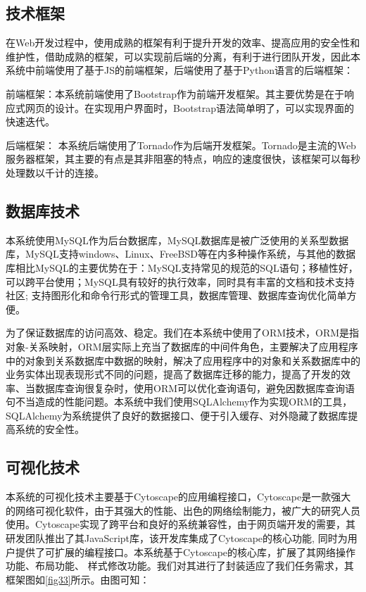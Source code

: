 \subsection{技术框架}
在Web开发过程中，使用成熟的框架有利于提升开发的效率、提高应用的安全性和维护性，借助成熟的框架，可以实现前后端的分离，有利于进行团队开发，因此本系统中前端使用了基于JS的前端框架，后端使用了基于Python语言的后端框架：

前端框架：本系统前端使用了Bootstrap作为前端开发框架。其主要优势是在于响应式网页的设计。在实现用户界面时，Bootstrap语法简单明了，可以实现界面的快速迭代。

后端框架： 本系统后端使用了Tornado作为后端开发框架。Tornado是主流的Web服务器框架，其主要的有点是其非阻塞的特点，响应的速度很快，该框架可以每秒处理数以千计的连接。


\subsection{数据库技术}
本系统使用MySQL作为后台数据库，MySQL数据库是被广泛使用的关系型数据库，MySQL支持windows、Linux、FreeBSD等在内多种操作系统，与其他的数据库相比MySQL的主要优势在于：MySQL支持常见的规范的SQL语句；移植性好，可以跨平台使用；MySQL具有较好的执行效率，同时具有丰富的文档和技术支持社区; 支持图形化和命令行形式的管理工具，数据库管理、数据库查询优化简单方便。

为了保证数据库的访问高效、稳定。我们在本系统中使用了ORM技术，ORM是指对象-关系映射，ORM层实际上充当了数据库的中间件角色，主要解决了应用程序中的对象到关系数据库中数据的映射，解决了应用程序中的对象和关系数据库中的业务实体出现表现形式不同的问题，提高了数据库迁移的能力，提高了开发的效率、当数据库查询很复杂时，使用ORM可以优化查询语句，避免因数据库查询语句不当造成的性能问题。本系统中我们使用SQLAlchemy作为实现ORM的工具，SQLAlchemy为系统提供了良好的数据接口、便于引入缓存、对外隐藏了数据库提高系统的安全性。

\subsection{可视化技术}
本系统的可视化技术主要基于Cytoscape的应用编程接口，Cytoscape是一款强大的网络可视化软件，由于其强大的性能、出色的网络绘制能力，被广大的研究人员使用。Cytoscape实现了跨平台和良好的系统兼容性，由于网页端开发的需要，其研发团队推出了其JavaScript库，该开发库集成了Cytoscape的核心功能, 同时为用户提供了可扩展的编程接口。本系统基于Cytoscape的核心库，扩展了其网络操作功能、布局功能、 样式修改功能。我们对其进行了封装适应了我们任务需求，其框架图如\ref{fig33}所示。由图可知：



